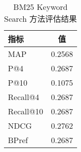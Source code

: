 \begin{table}[h]
\centering
\caption{BM25 Keyword Search 方法评估结果}
\begin{tabular}{|l|c|}
\hline
指标 & 值 \\
\hline
MAP & 0.2568 \\
P@4 & 0.2687 \\
P@10 & 0.1075 \\
Recall@4 & 0.2687 \\
Recall@10 & 0.2687 \\
NDCG & 0.2762 \\
BPref & 0.2687 \\
\hline
\end{tabular}
\end{table}
